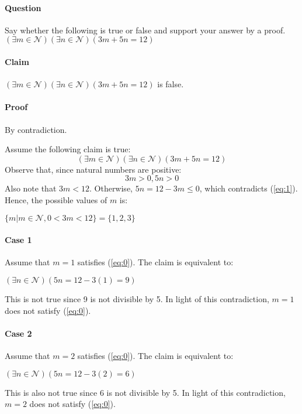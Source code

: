 \documentclass[14pt]{extarticle}
\begin{document}
	\paragraph{Question}
	Say whether the following is true or false and support your answer by a proof. $(\exists m \in \mathcal{N})(\exists n \in \mathcal{N})(3m+5n=12)$
	\paragraph{Claim}
	$(\exists m \in \mathcal{N})(\exists n \in \mathcal{N})(3m+5n=12)$ is false.
	\paragraph{Proof} By contradiction.
	\par\bigskip
	Assume the following claim is true:
	\begin{equation}\label{eq:0}
	(\exists m \in \mathcal{N})(\exists n \in \mathcal{N})(3m+5n=12) 
	\end{equation}
	Observe that, since natural numbers are positive:
	\begin{equation}\label{eq:1}
	3m > 0, 5n > 0
	\end{equation}
	Also note that $3m < 12$.  Otherwise, $5n = 12-3m \le 0$, which contradicts (\ref{eq:1}).  Hence, the possible values of $m$ is:
	\begin{center}
	$\{m | m \in \mathcal{N}, 0 < 3m < 12\} = \{1, 2, 3\}$
	\end{center}
	\paragraph{Case 1} Assume that $m=1$ satisfies (\ref{eq:0}).  The claim is equivalent to:
	\begin{center}
	$(\exists n \in \mathcal{N}) (5n = 12-3(1) = 9)$
	\end{center}
	This is not true since 9 is not divisible by 5.  In light of this contradiction, $m=1$ does not satisfy (\ref{eq:0}).
	\paragraph{Case 2} Assume that $m=2$ satisfies (\ref{eq:0}).  The claim is equivalent to:
	\begin{center}
	$(\exists n \in \mathcal{N}) (5n = 12-3(2) = 6)$
	\end{center}
	This is also not true since 6 is not divisible by 5.  In light of this contradiction, $m=2$ does not satisfy (\ref{eq:0}).
\end{document}
